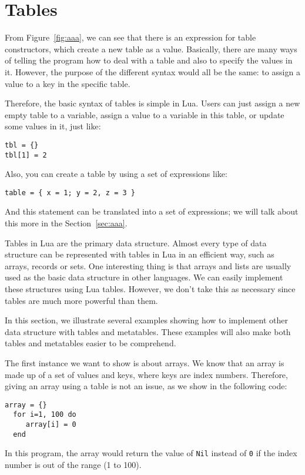 \section{Tables}
From Figure~\ref{fig:aaa}, we can see that there is an expression for table constructors, which create a new table as a value. Basically, there are many ways of telling the program how to deal with a table and also to specify the values in it. However, the purpose of the different syntax would all be the same: to assign a value to a key in the specific table.

Therefore, the basic syntax of tables is simple in Lua. Users can just assign a new empty table to a variable, assign a value to a variable in this table, or update some values in it, just like:
\begin{flushleft}
\tt tbl = \{\} \\
\tt tbl[1] = 2 \\
\end{flushleft}
Also, you can create a table by using a set of expressions like:
\begin{flushleft}
\tt table = \{ x = 1; y = 2, z = 3 \} \\
\end{flushleft}
And this statement can be translated into a set of expressions; we will talk about this more in the Section~\ref{sec:aaa}.

Tables in Lua are the primary data structure. Almost every type of data structure can be represented with tables in Lua in an efficient way, such as arrays, records or sets. One interesting thing is that arrays and lists are usually used as the basic data structure in other languages. We can easily implement these structures using Lua tables. However, we don't take this as necessary since tables are much more powerful than them.


In this section, we illustrate several examples showing how to implement other data structure with tables and metatables. These examples will also make both tables and metatables easier to be comprehend.

The first instance we want to show is about arrays. We know that an array is made up of a set of values and keys, where keys are index numbers. Therefore, giving an array using a table is not an issue, as we show in the following code:
\begin{flushleft}
\tt array = \{\} \\
\tt ~~for i=1, 100 do\\
\tt ~~~~ array[i] = 0\\
\tt ~~end\\
\end{flushleft}
In this program, the array would return the value of {\tt Nil} instead of {\tt 0} if the index number is out of the range (1 to 100).

